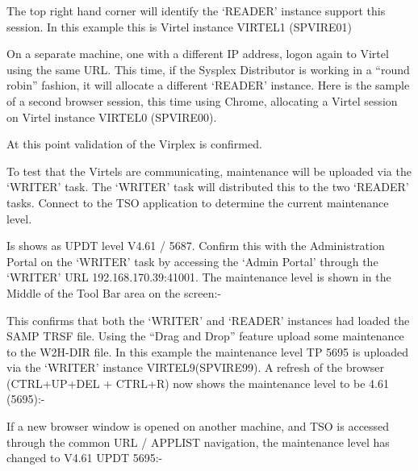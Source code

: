 \documentclass[letterpaper,10pt,english]{sphinxmanual}
\begin{document}

The top right hand corner will identify the ‘READER’ instance support this session. In this example this is Virtel instance VIRTEL1 (SPVIRE01)


On a separate machine, one with a different IP address, logon again to Virtel using the same URL. This time, if the Sysplex Distributor is working in a “round robin” fashion, it will allocate a different ‘READER’ instance. Here is the sample of a second browser session, this time using Chrome, allocating a Virtel session on Virtel instance VIRTEL0 (SPVIRE00).


At this point validation of the Virplex is confirmed.

\ignorespaces 
{}

To test that the Virtels are communicating, maintenance will be uploaded via the ‘WRITER’ task. The ‘WRITER’ task will distributed this to the two ‘READER’ tasks. Connect to the TSO application to determine the current maintenance level.


Is shows as UPDT level V4.61 / 5687. Confirm this with the Administration Portal on the ‘WRITER’ task by accessing the ‘Admin Portal’ through the ‘WRITER’ URL 192.168.170.39:41001. The maintenance level is shown in the Middle of the Tool Bar area on the screen:-


This confirms that both the ‘WRITER’ and ‘READER’ instances had loaded the SAMP TRSF file. Using the “Drag and Drop” feature upload some maintenance to the W2H-DIR file. In this example the maintenance level TP 5695 is uploaded via the ‘WRITER’ instance VIRTEL9(SPVIRE99). A refresh of the browser (CTRL+UP+DEL + CTRL+R) now shows the maintenance level to be 4.61 (5695):-


If a new browser window is opened on another machine, and TSO is accessed through the common URL / APPLIST navigation, the maintenance level has changed to V4.61 UPDT 5695:-
\end{document}
